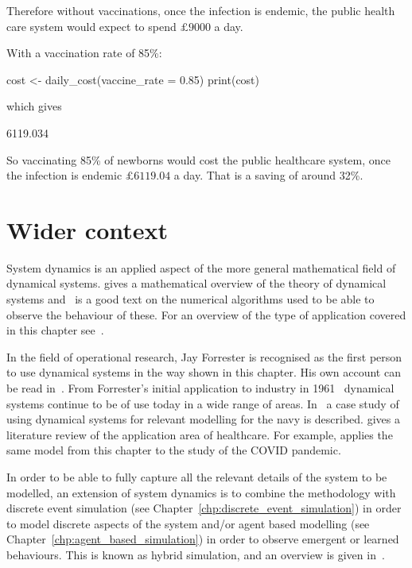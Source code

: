 Therefore without vaccinations, once the infection is endemic, the public health
care system would expect to spend $\pounds 9000$ a day.

With a vaccination rate of 85\%:

\begin{Rin}
cost <- daily_cost(vaccine_rate = 0.85)
print(cost)
\end{Rin}

which gives

\begin{Rout}
[1] 6119.034
\end{Rout}

So vaccinating 85\% of newborns would cost the public healthcare system, once
the infection is endemic $\pounds 6119.04$ a day. That is a saving of around
32\%.

\section{Wider context}\label{sec:system_dynamics_wider_context}

System dynamics is an applied aspect of the more general mathematical field of
dynamical systems. \cite{robinson1998dynamical} gives a
mathematical overview of the theory of dynamical systems and~\cite{burden2001numerical}
is a good text on the numerical algorithms used to be able to observe the
behaviour of these. For an overview of the type of
application covered in this chapter see~\cite{martin2006theory}.

In the field of operational research, Jay
Forrester is recognised as the first
person to use dynamical systems in the way shown in this chapter.
His own account can be read in~\cite{forrester1995beginning}. From Forrester's
initial application to industry in 1961~\cite{forrester1961industrial} dynamical
systems continue to be of use today in a wide range of areas.
In~\cite{coyle1999system} a case study of using dynamical systems for relevant
modelling for the navy is described.
\cite{vazquez2020system} gives a literature review of the application area
of healthcare. For example, \cite{cooper2020sir} applies the
same model from this chapter to the study of the COVID pandemic.

In order to be able to fully capture all the relevant details of the system to be
modelled, an extension of system dynamics is to combine the methodology with
discrete event simulation (see
Chapter~\ref{chp:discrete_event_simulation}) in order to model discrete aspects
of the system and/or agent based modelling (see
Chapter~\ref{chp:agent_based_simulation}) in order to observe emergent or learned
behaviours. This is known as hybrid simulation, and an
overview is given in~\cite{brailsford2019hybrid}.
